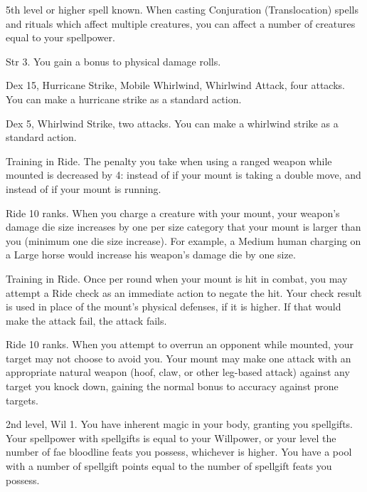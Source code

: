 \featpre 5th level or higher  spell known.
\featben When casting Conjuration (Translocation) spells and rituals which affect multiple creatures, you can affect a number of creatures equal to your spellpower.

\featpres Str 3.
\featben You gain a  bonus to physical damage rolls.

\featpres Dex 15, Hurricane Strike, Mobile Whirlwind, Whirlwind Attack, four attacks.
\featben You can make a hurricane strike as a standard action.

\featpres Dex 5, Whirlwind Strike, two attacks.
\featben You can make a whirlwind strike as a standard action.

\featpre Training in Ride.
\featben The penalty you take when using a ranged weapon while mounted is decreased by 4:  instead of  if your mount is taking a double move, and  instead of  if your mount is running.

\featpre Ride 10 ranks.
\featben When you charge a creature with your mount, your weapon's damage die size increases by one per size category that your mount is larger than you (minimum one die size increase).
For example, a Medium human charging on a Large horse would increase his weapon's damage die by one size.

\featpre Training in Ride.
\featben Once per round when your mount is hit in combat, you may attempt a Ride check as an immediate action to negate the hit.
Your check result is used in place of the mount's physical defenses, if it is higher.
If that would make the attack fail, the attack fails.

\featpre Ride 10 ranks.
\featben When you attempt to overrun an opponent while mounted, your target may not choose to avoid you.
Your mount may make one attack with an appropriate natural weapon (hoof, claw, or other leg-based attack) against any target you knock down, gaining the normal  bonus to accuracy against prone targets.

\featpres 2nd level, Wil 1.
\featben You have inherent magic in your body, granting you spellgifts.
Your spellpower with spellgifts is equal to your Willpower, or your level \add the number of fae bloodline feats you possess, whichever is higher.
You have a pool with a number of spellgift points equal to the number of spellgift feats you possess.

